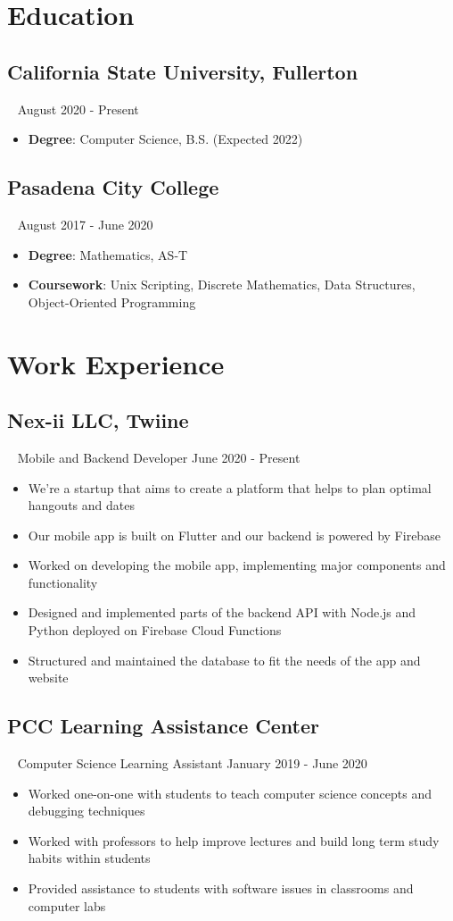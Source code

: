 \documentclass{article}
\newcommand{\resumesection}[3]{
    \subsection*{#1}
    \ 
    \footnotesize
    \textcolor{csufgrey}{#2}
    \footnotesize
    \hfill
    \textcolor{csufgrey}{#3}
    \normalsize
}
\begin{document}
\pagestyle{useheader}

\section*{Education}
\resumesection{California State University, Fullerton}{}{August 2020 - Present}
\begin{itemize}
    \item \textbf{Degree}: Computer Science, B.S. (Expected 2022)
\end{itemize}
\resumesection{Pasadena City College}{}{August 2017 - June 2020}
\begin{itemize}
    \item \textbf{Degree}: Mathematics, AS-T
    \item \textbf{Coursework}: Unix Scripting, Discrete Mathematics, Data Structures, Object-Oriented Programming
\end{itemize}
\hfill
\section*{Work Experience}
\resumesection{Nex-ii LLC, Twiine}{Mobile and Backend Developer}{June 2020 - Present}
\begin{itemize}
    \item We're a startup that aims to create a platform that helps to plan optimal hangouts and dates
    \item Our mobile app is built on Flutter and our backend is powered by Firebase
    \item Worked on developing the mobile app, implementing major components and functionality
    \item Designed and implemented parts of the backend API with Node.js and Python deployed on Firebase Cloud Functions
    \item Structured and maintained the database to fit the needs of the app and website
\end{itemize}
\resumesection{PCC Learning Assistance Center}{Computer Science Learning Assistant}{January 2019 - June 2020}
\begin{itemize}
    \item Worked one-on-one with students to teach computer science concepts and debugging techniques
    \item Worked with professors to help improve lectures and build long term study habits within students
    \item Provided assistance to students with software issues in classrooms and computer labs
\end{itemize}
\hfill
\end{document}
